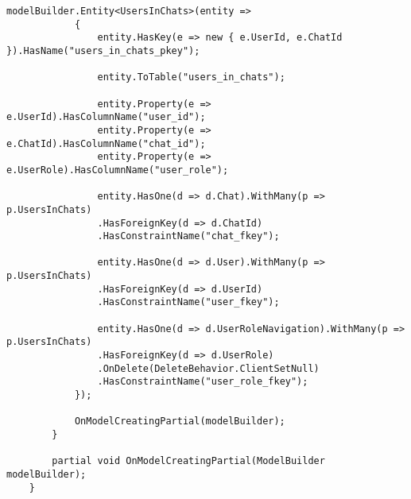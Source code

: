 \begin{lstlisting}[style=c#]
			modelBuilder.Entity<UsersInChats>(entity =>
			{
				entity.HasKey(e => new { e.UserId, e.ChatId }).HasName("users_in_chats_pkey");
				
				entity.ToTable("users_in_chats");
				
				entity.Property(e => e.UserId).HasColumnName("user_id");
				entity.Property(e => e.ChatId).HasColumnName("chat_id");
				entity.Property(e => e.UserRole).HasColumnName("user_role");
				
				entity.HasOne(d => d.Chat).WithMany(p => p.UsersInChats)
				.HasForeignKey(d => d.ChatId)
				.HasConstraintName("chat_fkey");
				
				entity.HasOne(d => d.User).WithMany(p => p.UsersInChats)
				.HasForeignKey(d => d.UserId)
				.HasConstraintName("user_fkey");
				
				entity.HasOne(d => d.UserRoleNavigation).WithMany(p => p.UsersInChats)
				.HasForeignKey(d => d.UserRole)
				.OnDelete(DeleteBehavior.ClientSetNull)
				.HasConstraintName("user_role_fkey");
			});
			
			OnModelCreatingPartial(modelBuilder);
		}
		
		partial void OnModelCreatingPartial(ModelBuilder modelBuilder);
	}	
\end{lstlisting}

